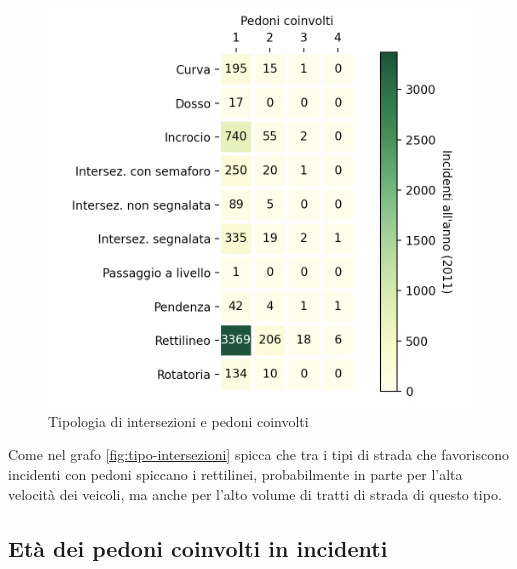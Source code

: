 \documentclass[a4paper]{report}
\begin{document}
\begin{figure}
    \includegraphics[width=\linewidth]{../src/incidenti/incidenti_senza_coords/pedoni/pedoni_incroci.png}
    \caption{Tipologia di intersezioni e pedoni coinvolti}
    \label{fig:pedoni-intersezioni}
\end{figure}

Come nel grafo \ref{fig:tipo-intersezioni} spicca che 
tra i tipi di strada che favoriscono incidenti con pedoni spiccano i rettilinei, 
probabilmente in parte per l'alta velocità dei veicoli, ma anche per l'alto volume di
tratti di strada di questo tipo.

\subsection{Età dei pedoni coinvolti in incidenti}
\end{document}
